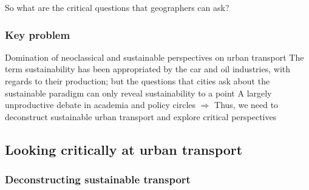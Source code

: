 \documentclass{article}
\begin{document}
So what are the critical questions that geographers can ask?

\subsubsection{Key problem}

\begin{outline}
	\1 Domination of neoclassical and sustainable perspectives on urban transport
		\2 The term sustainability has been appropriated by the car and oil industries, with regards to their production; but the questions that cities ask about the sustainable paradigm can only reveal sustainability to a point
		\2 A largely unproductive debate in academia and policy circles
	\1 $\Rightarrow$ Thus, we need to deconstruct sustainable urban transport and explore critical perspectives
\end{outline}

\subsection{Looking critically at urban transport}

\subsubsection{Deconstructing sustainable transport}
\end{document}
